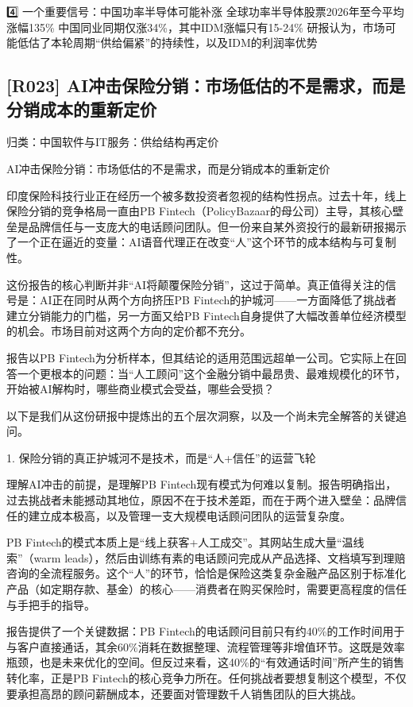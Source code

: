 \documentclass[11pt]{ctexart}
\begin{document}
4️⃣ 一个重要信号：中国功率半导体可能补涨 全球功率半导体股票2026年至今平均涨幅135\% 中国同业同期仅涨34\%，其中IDM涨幅只有15-24\% 研报认为，市场可能低估了本轮周期“供给偏紧”的持续性，以及IDM的利润率优势

\subsection{[R023] AI冲击保险分销：市场低估的不是需求，而是分销成本的重新定价}
{\small\color{refgray}归类：中国软件与IT服务：供给结构再定价}

AI冲击保险分销：市场低估的不是需求，而是分销成本的重新定价

印度保险科技行业正在经历一个被多数投资者忽视的结构性拐点。过去十年，线上保险分销的竞争格局一直由PB Fintech（PolicyBazaar的母公司）主导，其核心壁垒是品牌信任与一支庞大的电话顾问团队。但一份来自某外资投行的最新研报揭示了一个正在逼近的变量：AI语音代理正在改变“人”这个环节的成本结构与可复制性。

这份报告的核心判断并非“AI将颠覆保险分销”，这过于简单。真正值得关注的信号是：AI正在同时从两个方向挤压PB Fintech的护城河——一方面降低了挑战者建立分销能力的门槛，另一方面又给PB Fintech自身提供了大幅改善单位经济模型的机会。市场目前对这两个方向的定价都不充分。

报告以PB Fintech为分析样本，但其结论的适用范围远超单一公司。它实际上在回答一个更根本的问题：当“人工顾问”这个金融分销中最昂贵、最难规模化的环节，开始被AI解构时，哪些商业模式会受益，哪些会受损？

以下是我们从这份研报中提炼出的五个层次洞察，以及一个尚未完全解答的关键追问。

1. 保险分销的真正护城河不是技术，而是“人+信任”的运营飞轮

理解AI冲击的前提，是理解PB Fintech现有模式为何难以复制。报告明确指出，过去挑战者未能撼动其地位，原因不在于技术差距，而在于两个进入壁垒：品牌信任的建立成本极高，以及管理一支大规模电话顾问团队的运营复杂度。

PB Fintech的模式本质上是“线上获客+人工成交”。其网站生成大量“温线索”（warm leads），然后由训练有素的电话顾问完成从产品选择、文档填写到理赔咨询的全流程服务。这个“人”的环节，恰恰是保险这类复杂金融产品区别于标准化产品（如定期存款、基金）的核心——消费者在购买保险时，需要更高程度的信任与手把手的指导。

报告提供了一个关键数据：PB Fintech的电话顾问目前只有约40\%的工作时间用于与客户直接通话，其余60\%消耗在数据整理、流程管理等非增值环节。这既是效率瓶颈，也是未来优化的空间。但反过来看，这40\%的“有效通话时间”所产生的销售转化率，正是PB Fintech的核心竞争力所在。任何挑战者要想复制这个模型，不仅要承担高昂的顾问薪酬成本，还要面对管理数千人销售团队的巨大挑战。
\end{document}
